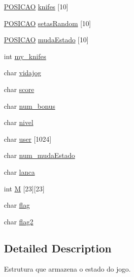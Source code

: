 \begin{DoxyCompactItemize}
\item 
\hyperlink{estado_8h_a55b3f4b56938eeb8fa5e8f9c07baf1b0}{P\+O\+S\+I\+C\+A\+O} \hyperlink{structestado_a0e31bf5f0fcb0eda5d1cf8326e0afe1b}{knifes} \mbox{[}10\mbox{]}
\item 
\hyperlink{estado_8h_a55b3f4b56938eeb8fa5e8f9c07baf1b0}{P\+O\+S\+I\+C\+A\+O} \hyperlink{structestado_aece5339d5a9196c4bf14b209b9355455}{setas\+Random} \mbox{[}10\mbox{]}
\item 
\hyperlink{estado_8h_a55b3f4b56938eeb8fa5e8f9c07baf1b0}{P\+O\+S\+I\+C\+A\+O} \hyperlink{structestado_a6b5ca65721918ba9f58752b16b37f69b}{muda\+Estado} \mbox{[}10\mbox{]}
\item 
int \hyperlink{structestado_a430d95bf7e8f9bb91974c559c721fffd}{my\+\_\+knifes}
\item 
char \hyperlink{structestado_a38a9752f3c9a5186d05b28137a1a559a}{vidajog}
\item 
char \hyperlink{structestado_a312d7aee47aeea05c30f01ff16fa8679}{score}
\item 
char \hyperlink{structestado_a049c518bf8234b3477b9b34ec46cdf06}{num\+\_\+bonus}
\item 
char \hyperlink{structestado_a620f2f81ebfe4cba1d6e44b09a1762f7}{nivel}
\item 
char \hyperlink{structestado_a9abaf37f25e76a0a6b4e02ba30d15119}{user} \mbox{[}1024\mbox{]}
\item 
char \hyperlink{structestado_a036e8e4f35600bb8f0035dc4dd1424fb}{num\+\_\+muda\+Estado}
\item 
char \hyperlink{structestado_ad8331bf08d6d11e7590dd28d87471e40}{lanca}
\item 
int \hyperlink{structestado_aaafe981518f0c0aab09e842e9e8c3564}{M} \mbox{[}23\mbox{]}\mbox{[}23\mbox{]}
\item 
char \hyperlink{structestado_a4097f5ea4c96bc29ee48b6e3dd1c743b}{flag}
\item 
char \hyperlink{structestado_a76a9cfcab40ee794f38ca97867b433a5}{flag2}
\end{DoxyCompactItemize}


\subsection{Detailed Description}
Estrutura que armazena o estado do jogo. 

